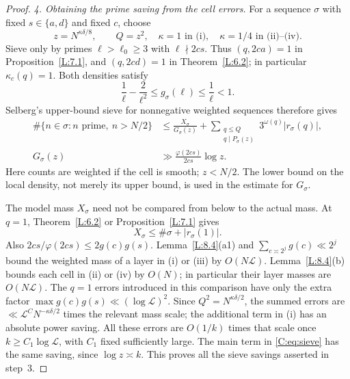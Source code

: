 \documentclass[10pt,reqno]{amsart}
\theoremstyle{definition}
\numberwithin{equation}{section}
\newcommand{\cL}{\mathcal L}
\begin{document}
\begin{proof}
\smallskip\noindent
\emph{4. Obtaining the prime saving from the cell errors.}
For a sequence $\sigma$ with fixed $s\in\{a,d\}$ and fixed $c$, choose
\[
 z=N^{\kappa\delta/8},\qquad Q=z^2,
 \quad \kappa=1\text{ in (i)},\quad \kappa=1/4\text{ in (ii)--(iv)}.
\]
Sieve only by primes $\ell>\ell_0\geq3$ with $\ell\nmid2cs$.
Thus $(q,2ca)=1$ in Proposition~\ref{L:7.1}, and $(q,2cd)=1$ in
Theorem~\ref{L:6.2}; in particular $\kappa_c(q)=1$. Both densities satisfy
\[
 \frac1\ell-\frac2{\ell^2}\leq g_\sigma(\ell)\leq\frac1\ell<1.
\]
Selberg's upper-bound sieve \cite[Theorem~4.1 and Lemma~4.1]{HR}
for nonnegative weighted sequences therefore gives
\begin{equation}\label{C:eq:sieve}
 \begin{aligned}
 \#\{n\in\sigma:n\text{ prime},\ n>N/2\}
 &\leq\frac{X_\sigma}{G_\sigma(z)}+
 \sum_{\substack{q\leq Q\\q\mid P_\sigma(z)}}
 3^{\omega(q)}|r_\sigma(q)|,\\
 G_\sigma(z)&\gg\frac{\varphi(2cs)}{2cs}\log z.
 \end{aligned}
\end{equation}
Here counts are weighted if the cell is smooth; $z<N/2$.
The lower bound on the local density, not merely its upper bound,
is used in the estimate for $G_\sigma$.

The model mass $X_\sigma$ need not be compared from below to the actual
mass.  At $q=1$, Theorem~\ref{L:6.2} or Proposition~\ref{L:7.1} gives
\[
 X_\sigma\leq\#\sigma+|r_\sigma(1)|.
\]
Also $2cs/\varphi(2cs)\leq2g(c)g(s)$.
Lemma~\ref{L:8.4}(a1) and $\sum_{c\asymp2^j}g(c)\ll2^j$ bound
the weighted mass of a layer in (i) or (iii) by $O(N\cL)$.
Lemma~\ref{L:8.4}(b) bounds each cell in (ii) or (iv) by $O(N)$;
in particular their layer masses are $O(N\cL)$.
The $q=1$ errors introduced in this comparison have only the extra
factor $\max g(c)g(s)\ll(\log\cL)^2$.
Since $Q^2=N^{\kappa\delta/2}$, the summed errors are
$\ll\cL^CN^{-\kappa\delta/2}$ times the relevant mass scale;
the additional term in (i) has an absolute power saving.
All these errors are $O(1/k)$ times that scale once
$k\geq C_1\log\cL$, with $C_1$ fixed sufficiently large.
The main term in \eqref{C:eq:sieve} has the same saving, since
$\log z\asymp k$.  This proves all the sieve savings asserted in step~3.


\end{proof}
\end{document}
